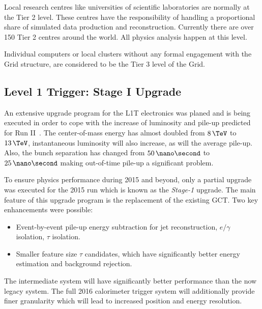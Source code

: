Local research centres like universities of scientific laboratories are normally at the Tier 2 level. These centres have the responsibility of handling a proportional share of simulated data production and reconstruction. Currently there are over 150 Tier 2 centres around the world. All physics analysis happen at this level.

Individual computers or local clusters without any formal engagement with the Grid structure, are considered to be the Tier 3 level of the Grid. 

\subsection{Level 1 Trigger: Stage I Upgrade}
\label{SUBSECTION:ExperimentalApparatus_CMS_L1TStage1}


An extensive upgrade program for the \gls{L1T} electronics was planed and is being executed in order to cope with the increase of luminosity and pile-up predicted for Run II~\cite{CMSTDR:CMSL1Upgrade,CMSTDR:CMSUpgradeTDR}. The center-of-mass energy has almost doubled from $8\,\TeV$ to $13\,\TeV$, instantaneous luminosity will also increase, as will the average pile-up. Also, the bunch separation has changed from $50\,\nano\second$ to $25\,\nano\second$ making out-of-time pile-up a significant problem. 

To ensure physics performance during 2015 and beyond, only a partial upgrade was executed for the 2015 run which is known as the \textit{Stage-1} upgrade. The main feature of this upgrade program is the replacement of the existing \gls{GCT}. Two key enhancements were possible: 

\begin{itemize}
  \item Event-by-event pile-up energy subtraction for jet reconstruction, $e/\gamma$ isolation, $\tau$ isolation.
  \item Smaller feature size $\tau$ candidates, which have significantly better energy estimation and background rejection.
\end{itemize}

The intermediate system will have significantly better performance than the now legacy system. The full 2016 calorimeter trigger system will additionally provide finer granularity which will lead to increased position and energy resolution. 
